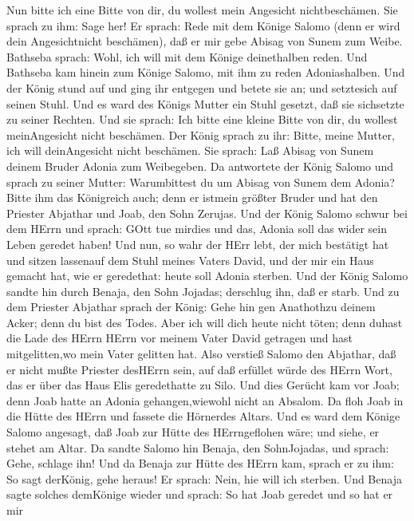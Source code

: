 Nun bitte ich eine Bitte von dir, du wollest mein Angesicht
nichtbeschämen. Sie sprach zu ihm: Sage her!  Er sprach:
Rede mit dem Könige Salomo (denn er wird dein Angesichtnicht beschämen),
daß er mir gebe Abisag von Sunem zum Weibe.  Bathseba
sprach: Wohl, ich will mit dem Könige deinethalben reden. 
Und Bathseba kam hinein zum Könige Salomo, mit ihm zu reden
Adoniashalben. Und der König stund auf und ging ihr entgegen und betete
sie an; und setztesich auf seinen Stuhl. Und es ward des Königs Mutter
ein Stuhl gesetzt, daß sie sichsetzte zu seiner Rechten. 
Und sie sprach: Ich bitte eine kleine Bitte von dir, du wollest
meinAngesicht nicht beschämen. Der König sprach zu ihr: Bitte, meine
Mutter, ich will deinAngesicht nicht beschämen.  Sie
sprach: Laß Abisag von Sunem deinem Bruder Adonia zum Weibegeben.
 Da antwortete der König Salomo und sprach zu seiner
Mutter: Warumbittest du um Abisag von Sunem dem Adonia? Bitte ihm das
Königreich auch; denn er istmein größter Bruder und hat den Priester
Abjathar und Joab, den Sohn Zerujas.  Und der König Salomo
schwur bei dem HErrn und sprach: GOtt tue mirdies und das, Adonia soll
das wider sein Leben geredet haben!  Und nun, so wahr der
HErr lebt, der mich bestätigt hat und sitzen lassenauf dem Stuhl meines
Vaters David, und der mir ein Haus gemacht hat, wie er geredethat: heute
soll Adonia sterben.  Und der König Salomo sandte hin durch
Benaja, den Sohn Jojadas; derschlug ihn, daß er starb.  Und
zu dem Priester Abjathar sprach der König: Gehe hin gen Anathothzu
deinem Acker; denn du bist des Todes. Aber ich will dich heute nicht
töten; denn duhast die Lade des HErrn HErrn vor meinem Vater David
getragen und hast mitgelitten,wo mein Vater gelitten hat. 
Also verstieß Salomo den Abjathar, daß er nicht mußte Priester desHErrn
sein, auf daß erfüllet würde des HErrn Wort, das er über das Haus Elis
geredethatte zu Silo.  Und dies Gerücht kam vor Joab; denn
Joab hatte an Adonia gehangen,wiewohl nicht an Absalom. Da floh Joab in
die Hütte des HErrn und fassete die Hörnerdes Altars.  Und
es ward dem Könige Salomo angesagt, daß Joab zur Hütte des HErrngeflohen
wäre; und siehe, er stehet am Altar. Da sandte Salomo hin Benaja, den
SohnJojadas, und sprach: Gehe, schlage ihn!  Und da Benaja
zur Hütte des HErrn kam, sprach er zu ihm: So sagt derKönig, gehe
heraus! Er sprach: Nein, hie will ich sterben. Und Benaja sagte solches
demKönige wieder und sprach: So hat Joab geredet und so hat er mir
